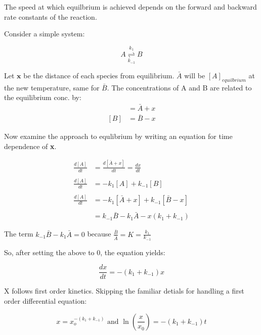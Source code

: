 \documentclass[12pt, letterpaper]{article}
\begin{document}
    The speed at which equilbrium is achieved depends on the forward and backward rate constants of the reaction. 

    Consider a simple system:

    \begin{equation*}
        A \stackrel{k_1}{\underset{k_{-1}}{\rightleftharpoons}} B
    \end{equation*}

    Let $\textbf{x}$ be the distance of each species from equilibrium. $\bar{A}$ will be $[A]_{equilbrium}$ at the new temperature, same for $\bar{B}$.
    The concentrations of A and B are related to the equilibrium conc. by: 
    \begin{align*}
        [A] &= \bar{A} + x \\
        [B] &= \bar{B} - x
    \end{align*}
    
    Now examine the approach to equlibrium by writing an equation for time dependence of \textbf{x}. 

    \begin{align*}
        \frac{d[A]}{dt} &= \frac{d[\bar{A} + x]}{dt} = \frac{dx}{dt} \\ \\ 
        \frac{d[A]}{dt} &= -k_1[A] + k_{-1}[B] \\ \\
        \frac{d[A]}{dt} &= -k_1[\bar{A} + x] + k_{-1}[\bar{B} - x] \\ \\
        &= k_{-1}\bar{B} - k_{1}\bar{A} - x(k_1 + k_{-1})
    \end{align*}

    The term \(k_{-1}\bar{B} - k_{1}\bar{A} = 0 \) because \( \frac{\bar{B}}{\bar{A}} = K = \frac{k_1}{k_{-1}} \)

    So, after setting the above to 0, the equation yields: 

    \begin{equation}
        \frac{dx}{dt} = -(k_1 + k_{-1})x
    \end{equation}

    X follows first order kinetics. Skipping the familiar detials for handling a first order differential equation: 

    \begin{equation}
        x = x_o^{-(k_1 + k_{-1})} \text{ and } \ln(\frac{x}{x_0}) = -(k_1 + k_{-1})t
    \end{equation}
\end{document}
